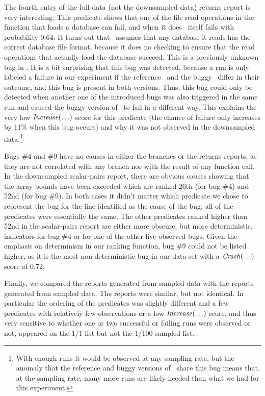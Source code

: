 The fourth entry of the full data (not the  downsampled data)
returns report is very interesting.  This predicate shows that one of
the file read operations in the function that loads a database can
fail, and when it does \moss\ itself fails with probability 0.64.
It turns out that \moss\ assumes that any database it reads has the
correct database file format, because it does no checking to ensure
that the read operations that actually load the database succeed.  This is a previously
unknown bug in \moss.  It is a bit surprising that this bug was detected,
because a run is only labeled a failure in our experiment if the
reference \moss\ and the buggy \moss\ differ in their outcome, and
this bug is present in both versions.  Thus, this bug could only be detected
when another one of the introduced bugs was also triggered in the same
run and caused the buggy version of \moss\ to fail in a different way.
This explains the very low $\mbox{\textit{Increase}}(\ldots)$ score for this
predicate (the chance of failure only increases by 11\% when this bug
occurs) and why it was not observed in the 
downsampled data.\footnote{With enough runs it would be observed at
  any sampling rate, but the anomaly that the reference and buggy
  versions of \moss\ share this bug means that, at the
   sampling rate, many more runs are likely needed
  than what we had for this experiment.}

Bugs \#4 and \#9 have no causes in either the branches or the returns
reports, as they are not correlated with any branch nor with the
result of any function call.  In the  downsampled
scalar-pairs report, there are obvious causes showing that the array
bounds have been exceeded which are ranked 26th (for bug \#4) and 52nd (for bug
\#9).  In both cases it didn't matter which predicate we chose to
represent the bug for the line identified as the cause of the bug; all
of the predicates were essentially the same.  The other
predicates ranked higher than 52nd in the scalar-pairs report are
either more obscure, but more deterministic, indicators for bug \#4 or
for one of the other five observed bugs.  Given the emphasis on
determinism in our ranking function, bug \#9 could not be listed
higher, as it is the most non-deterministic bug in our data set with a
$\mbox{\textit{Crash}}(\ldots)$ score of 0.72.

Finally, we compared the reports generated from  sampled data
with the reports generated from  sampled data.  The reports were
similar, but not identical.  In particular the ordering of the
predicates was slightly different and a few predicates with relatively
few observations or a low $\mbox{\textit{Increase}}(\ldots)$ score, and thus very
sensitive to whether one or two successful or failing runs were
observed or not, appeared on
the 1/1 list but not the 1/100 sampled list.

